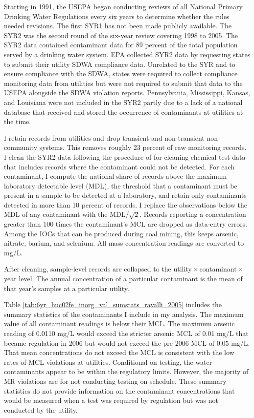\documentclass[12pt]{article}
\begin{document}
Starting in 1991, the USEPA began conducting reviews of all National Primary Drinking Water Regulations every six years to determine whether the rules needed revisions. The first SYR1 has not been made publicly available. The SYR2 was the second round of the six-year review covering 1998 to 2005. The SYR2 data contained contaminant data for 89 percent of the total population served by a drinking water system. EPA collected SYR2 data by requesting states to submit their utility SDWA compliance data. Unrelated to the SYR and to ensure compliance with the SDWA, states were required to collect compliance monitoring data from utilities but were not required to submit that data to the USEPA alongside the SDWA violation reports. Pennsylvania, Mississippi, Kansas, and Louisiana were not included in the SYR2 partly due to a lack of a national database that received and stored the occurrence of contaminants at utilities at the time.

I retain records from utilities and drop transient and non-transient non-community systems. This removes roughly 23 percent of raw monitoring records. I clean the SYR2 data following the procedure of \textcite{ravalli2022sociodemographic} for cleaning chemical test data that includes records where the contaminant could not be detected. For each contaminant, I compute the national share of records above the maximum laboratory detectable level (MDL), the threshold that a contaminant must be present in a sample to be detected at a laboratory, and retain only contaminants detected in more than 10 percent of records. I replace the observations below the MDL of any contaminant with the MDL/$\sqrt{2}$. Records reporting a concentration greater than 100 times the contaminant's MCL are dropped as data-entry errors. Among the IOCs that can be produced during coal mining, this keeps arsenic, nitrate, barium, and selenium. All mass-concentration readings are converted to mg/L.

After cleaning, sample-level records are collapsed to the utility\,$\times$\,contaminant\,$\times$\,year level. The annual concentration of a particular contaminant is the mean of that year's samples at a particular utility.

Table \ref{tab:6yr_huc02fe_inorg_val_sumstats_ravalli_2005} includes the summary statistics of the contaminants I include in my analysis. The maximum value of all contaminant readings is below their MCL. The maximum arsenic reading of 0.0110 mg/L would exceed the stricter arsenic MCL of 0.01 mg/L that became regulation in 2006 but would not exceed the pre-2006 MCL of 0.05 mg/L. That mean concentrations do not exceed the MCL is consistent with the low rates of MCL violations at utilities. Conditional on testing, the water contaminants appear to be within the regulatory limits. However, the majority of MR violations are for not conducting testing on schedule. These summary statistics do not provide information on the contaminant concentrations that would be measured when a test was required by regulation but was not conducted by the utility.
\end{document}
